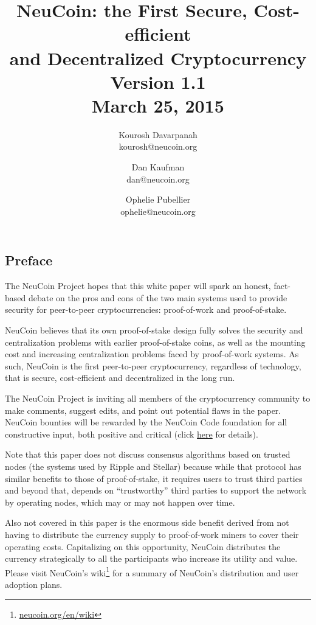 \documentclass[a4paper,11pt]{article}
\title{\vspace{-5mm}NeuCoin: the First Secure, Cost-efficient\\ and Decentralized Cryptocurrency\\
  \vspace{8mm}
  \large Version 1.1\\ March 25, 2015\vspace{3mm}}
\author{
  Kourosh Davarpanah\\
  kourosh@neucoin.org
  \and
  Dan Kaufman\\
  dan@neucoin.org
  \and
  Ophelie Pubellier\\
  ophelie@neucoin.org
\vspace{3mm}}
\date{}
\begin{document}
\maketitle 


\subsection*{Preface}

The NeuCoin Project hopes that this white paper will spark an honest, fact-based debate on the pros and cons of the two main systems used to provide security for peer-to-peer cryptocurrencies: proof-of-work and proof-of-stake. 
 
NeuCoin believes that its own proof-of-stake design fully solves the security and centralization problems with earlier proof-of-stake coins, as well as the mounting cost and increasing centralization problems faced by proof-of-work systems. As such, NeuCoin is the first peer-to-peer cryptocurrency, regardless of technology, that is secure, cost-efficient and decentralized in the long run.

The NeuCoin Project is inviting all members of the cryptocurrency community to make comments, suggest edits, and point out potential flaws in the paper. NeuCoin bounties will be rewarded by the NeuCoin Code foundation for all constructive input, both positive and critical (click \href{http://www.neucoin.org/en/whitepaper/#bounty-program}{here} for details).

Note that this paper does not discuss consensus algorithms based on trusted nodes (the systems used by Ripple and Stellar) because while that protocol has similar benefits to those of proof-of-stake, it requires users to trust third parties and beyond that, depends on “trustworthy” third parties to support the network by operating nodes, which may or may not happen over time.

Also not covered in this paper is the enormous side benefit derived from not having to distribute the currency supply to proof-of-work miners to cover their operating costs. Capitalizing on this opportunity, NeuCoin distributes the currency strategically to all the participants who increase its utility and value. Please visit NeuCoin's wiki\footnote{\href{http://www.neucoin.org/en/wiki/}{neucoin.org/en/wiki}} for a summary of NeuCoin's distribution and user adoption plans.

\newpage
\end{document}
